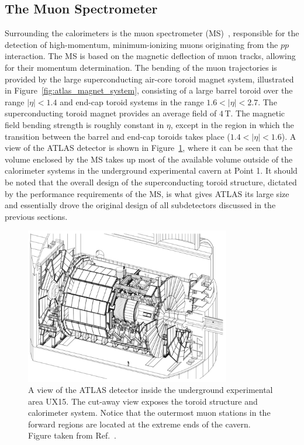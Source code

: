 \subsection{The Muon Spectrometer}
\label{sec:ms}

Surrounding the calorimeters is the muon spectrometer (MS)~\cite{CERN-LHCC-97-022}, responsible
for the detection of high-momentum, minimum-ionizing muons originating from the $pp$ interaction.
The MS is based on the magnetic deflection of muon tracks, allowing for their
momentum determination.
The bending of the muon trajectories is provided by the large
superconducting air-core toroid magnet system, illustrated in Figure~\ref{fig:atlas_magnet_system},
consisting of a large barrel toroid over the range $\lvert \eta \rvert < 1.4$
and end-cap toroid systems in the range $1.6 < \lvert \eta \rvert < 2.7$.
The superconducting toroid magnet provides an average field of $4\,$T.
The magnetic field bending strength is roughly constant in $\eta$, except in the
region in which the transition between the barrel and end-cap toroids takes place
($1.4 < \lvert \eta \rvert < 1.6$).
A view of the ATLAS detector is shown in Figure~\ref{fig:atlas_in_cavern},
where it can be seen that the volume enclosed by the MS takes up most of the available volume
outside of the calorimeter systems in the underground experimental cavern at Point 1.
It should be noted that the overall design of the superconducting toroid structure,
dictated by the performance requirements of the MS, is what gives ATLAS its large size and essentially
drove the original design of all subdetectors discussed in the previous sections.


\begin{figure}[!htb]
    \begin{center}
        \includegraphics[width=0.8\textwidth]{figures/chapter2/atlas_in_cavern}
        \caption{
            A view of the ATLAS detector inside the underground experimental area
            UX15.
            The cut-away view exposes the toroid structure and
            calorimeter system.
            Notice that the outermost muon stations in the forward regions are located
            at the extreme ends of the cavern.
            Figure taken from Ref.~\cite{CERN-LHCC-97-022}.
        }
        \label{fig:atlas_in_cavern}
    \end{center}
\end{figure}
\FloatBarrier

